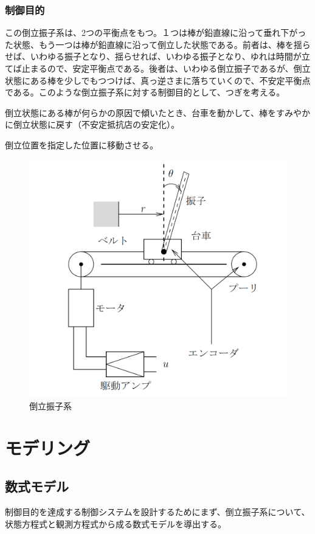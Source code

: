 \documentclass[a4j,11pt,twoside]{ujbook}
\begin{document}
\subsection{制御目的}
この倒立振子系は、2つの平衡点をもつ。１つは棒が鉛直線に沿って垂れ下がった状態、もう一つは棒が鉛直線に沿って倒立した状態である。前者は、棒を揺らせば、いわゆる振子となり、揺らせれば、いわゆる振子となり、ゆれは時間が立てば止まるので、安定平衡点である。後者は、いわゆる倒立振子であるが、倒立状態にある棒を少しでもつつけば、真っ逆さまに落ちていくので、不安定平衡点である。このような倒立振子系に対する制御目的として、つぎを考える。
\begin{description}
	\setlength{\itemindent}{0pt}
	\item[1゜]倒立状態にある棒が何らかの原因で傾いたとき、台車を動かして、棒をすみやかに倒立状態に戻す（不安定抵抗店の安定化）。
	\item[2゜]倒立位置を指定した位置に移動させる。
\end{description}
\begin{figure}[htbp]
	\begin{center}
		\includegraphics[width = 0.6 \linewidth]{model.png}
		\caption{倒立振子系}
		\label{fig:倒立振子系}
	\end{center}
\end{figure}

\chapter{モデリング}
\section{数式モデル}
制御目的を達成する制御システムを設計するためにまず、倒立振子系について、状態方程式と観測方程式から成る数式モデルを導出する。
\end{document}
